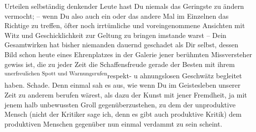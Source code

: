                Urteilen selbständig denkender Leute hast Du niemals das Geringste zu ändern
               vermocht; – wenn Du also auch ein oder das andere Mal im Einzelnen das Richtige zu
               treffen, öfter noch irrtümliche und voreingenommene Ansichten mit Witz und
               Geschicklichkeit zur Geltung zu bringen imstande warst – Dein Gesamtwirken hat bisher
               niemanden dauernd geschadet als Dir selbst, dessen Bild schon heute eines
               Ehrenplatzes in der Galerie jener berühmten Missversteher gewiss ist, die zu jeder
               Zeit die Schaffensfreude gerade der Besten mit ihrem \substVorne{}\textsuperscript{unerfreulichen Spott und Warnungsrufen}{\allowbreak}\substDazwischen{}respekt- u ahnungslosen Geschwätz\substHinten{} begleitet haben. Schade. Denn einmal sah es aus, wie wenn Du im Geistesleben
               unserer Zeit zu anderem berufen wärest, als dazu der
               Kunst mit jener Fremdheit, ja mit jenem halb unbewussten Groll gegenüberzustehen, zu
               dem der unproduktive Mensch (nicht der Kritiker sage ich, denn es gibt auch
               produktive Kritik) dem produktiven Menschen gegenüber nun einmal verdammt zu {\pb}sein scheint.\pend
           
